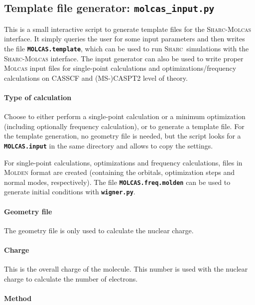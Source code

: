 \documentclass[a4paper,10pt,DIV=15,openany]{scrbook}
\newcommand{\sharc}{\textsc{Sharc}}
\newcommand{\ttt}[1]{\textbf{\texttt{#1}}}
\begin{document}
\subsection{Template file generator: \ttt{molcas\_input.py}}\label{sec:molcas_input.py}

This is a small interactive script to generate template files for the \sharc-\textsc{Molcas} interface. It simply queries the user for some input parameters and then writes the file \ttt{MOLCAS.template}, which can be used to run \sharc\ simulations with the \sharc-\textsc{Molcas} interface.
The input generator can also be used to write proper \textsc{Molcas} input files for single-point calculations and optimizations/frequency calculations on CASSCF and (MS-)CASPT2 level of theory.

\paragraph{Type of calculation}

Choose to either perform a single-point calculation or a minimum optimization (including optionally frequency calculation), or to generate a template file. For the template generation, no geometry file is needed, but the script looks for a \ttt{MOLCAS.input} in the same directory and allows to copy the settings. 

For single-point calculations, optimizations and frequency calculations, files in \textsc{Molden} format are created (containing the orbitals, optimization steps and normal modes, respectively). The file \ttt{MOLCAS.freq.molden} can be used to generate initial conditions with \ttt{wigner.py}.

\paragraph{Geometry file}

The geometry file is only used to calculate the nuclear charge.

\paragraph{Charge}

This is the overall charge of the molecule. This number is used with the nuclear charge to calculate the number of electrons.

\paragraph{Method}
\end{document}
